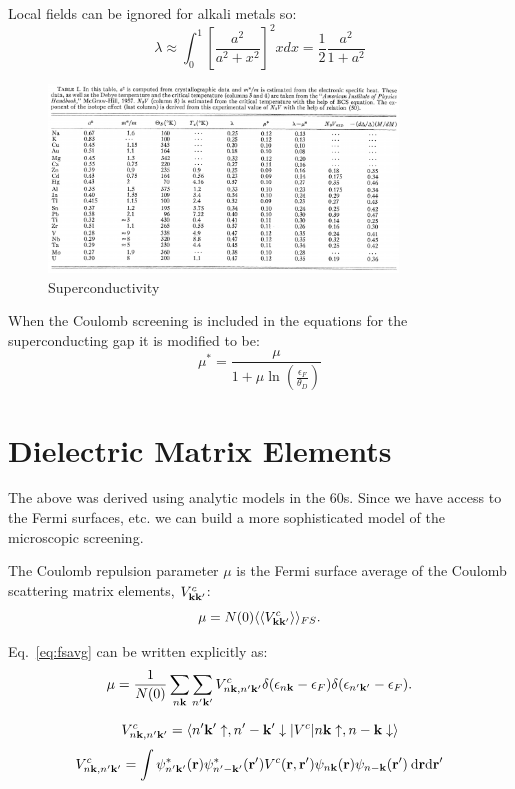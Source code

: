 \documentclass{article}
\def\r{{\bf r}}
\def\k{{\bf k}}
\def\bra{\langle}
\def\ket{\rangle}
\begin{document}
Local fields can be ignored for alkali metals so:
%
\begin{equation}
\lambda \approx \int_{0}^{1} \left[\frac{a^{2}}{a^{2}+x^{2}}\right]^{2}x dx=\frac{1}{2}\frac{a^{2}}{1+a^{2}}
\end{equation}
%
\begin{figure}
\label{fig:supercond}
\begin{center}
\includegraphics[height=50mm] {superconductingparameters.png}
\caption{\small Superconductivity}
\end{center}
\end{figure}
%
When the Coulomb screening is included in the equations for the 
superconducting gap it is modified to be:
%
\begin{equation}
\mu^{*} =  \frac{\mu}{1+ \mu \ln(\frac{\epsilon_{F}}{\theta_{D}})}
\end{equation}
%
\section{Dielectric Matrix Elements}
The above was derived using analytic models in the 60s. Since we have access
to the Fermi surfaces, etc. we can build a more sophisticated model of the
microscopic screening.

The Coulomb repulsion parameter $\mu$ is the Fermi surface average of the Coulomb
scattering matrix elements, $V^{c}_{\k\k'}$:
%
\begin{equation}
\label{eq:fsavg}
\mu = N(0) \bra\bra V^{c}_{\k\k'} \ket\ket_{FS}.
\end{equation}
%

Eq.~\ref{eq:fsavg} can be written explicitly as:
%
\begin{equation}
\mu = \frac{1}{N(0)} \sum_{n\k}\sum_{n'\k'}V^{c}_{n\k,n'\k'}\delta(\epsilon_{n\k}-\epsilon_{F})\delta(\epsilon_{n'\k'}-\epsilon_{F}).
\end{equation}
%

%
\begin{equation}
V^{c}_{n\k,n'\k'} = \bra n'\k'\uparrow, n'-\k'\downarrow |V^{c}| n\k\uparrow, 
n-\k\downarrow\ket
\end{equation}
%
\begin{equation}
V^{c}_{n\k,n'\k'} = \int \psi^{*}_{n'\k'}(\r)\psi^{*}_{n'-\k'}(\r') V^{c}(\r,\r')
\psi_{n\k}(\r)\psi_{n-\k}(\r')\:\rm{d}\r\mathrm{d}\r'
\end{equation}
%
\end{document}
